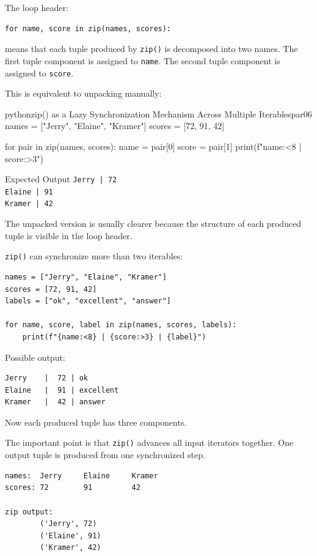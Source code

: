 \documentclass[a4paper,twoside]{report}
\begin{document}
The loop header:

\begin{verbatim}
for name, score in zip(names, scores):
\end{verbatim}

means that each tuple produced by \texttt{zip()} is decomposed into two names. The first tuple component is assigned to \texttt{name}. The second tuple component is assigned to \texttt{score}.

This is equivalent to unpacking manually:

\begin{codebox}[]{python}{zip() as a Lazy Synchronization Mechanism Across Multiple Iterables}{par06}
names = ["Jerry", "Elaine", "Kramer"]
scores = [72, 91, 42]

for pair in zip(names, scores):
    name = pair[0]
    score = pair[1]
    print(f"{name:<8} | {score:>3}")
\end{codebox}


\begin{iobox}{Expected Output}
\texttt{Jerry    |  72} \\
\texttt{Elaine   |  91} \\
\texttt{Kramer   |  42} \\
\end{iobox}


The unpacked version is usually clearer because the structure of each produced tuple is visible in the loop header.

\texttt{zip()} can synchronize more than two iterables:

\begin{verbatim}
names = ["Jerry", "Elaine", "Kramer"]
scores = [72, 91, 42]
labels = ["ok", "excellent", "answer"]

for name, score, label in zip(names, scores, labels):
    print(f"{name:<8} | {score:>3} | {label}")
\end{verbatim}

Possible output:

\begin{verbatim}
Jerry    |  72 | ok
Elaine   |  91 | excellent
Kramer   |  42 | answer
\end{verbatim}

Now each produced tuple has three components.

The important point is that \texttt{zip()} advances all input iterators together. One output tuple is produced from one synchronized step.

\begin{verbatim}
names:  Jerry     Elaine     Kramer
scores: 72        91         42

zip output:
        ('Jerry', 72)
        ('Elaine', 91)
        ('Kramer', 42)
\end{verbatim}
\end{document}
